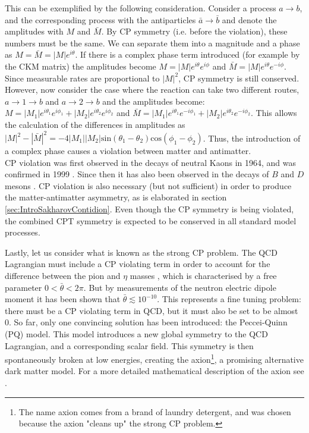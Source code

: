 This can be exemplified by the following consideration. Consider a process $a \rightarrow b$, and the corresponding process with the antiparticles $\bar{a} \rightarrow \bar{b}$ and denote the amplitudes with $M$ and $\bar{M}$. By CP symmetry (i.e. before the violation), these numbers must be the same. We can separate them into a magnitude and a phase as $M = \bar{M} = |M|e^{i\theta}$. If there is a complex phase term introduced (for example by the CKM matrix) the amplitudes become $M = |M|e^{i\theta}e^{i\phi}$ and $\bar{M} = |M|e^{i\theta}e^{-i\phi}$. Since measurable rates are proportional to $|M|^2$, CP symmetry is still conserved. However, now consider the case where the reaction can take two different routes, $a \rightarrow 1 \rightarrow b$ and $a \rightarrow 2 \rightarrow b$ and the amplitudes become: $M = |M_1|e^{i\theta_1}e^{i\phi_1} + |M_2|e^{i\theta_2}e^{i\phi_2}$ and $\bar{M} = |M_1|e^{i\theta_1}e^{-i\phi_1} + |M_2|e^{i\theta_2}e^{-i\phi_2}$. This allows the calculation of the differences in amplitudes as $|M|^2 - |\bar{M}|^2 = -4|M_1||M_2|\mathrm{sin}(\theta_1 - \theta_2)\mathrm{cos}(\phi_1 - \phi_2)$. Thus, the introduction of a complex phase causes a violation between matter and antimatter. \\
CP violation was first observed in the decays of neutral Kaons\cite{CP_violations_early} in 1964, and was confirmed in 1999 \cite{CP_violations_proof}. Since then it has also been observed in the decays of $B$ and $D$ mesons \cite{CP_violation_B, CP_violation_D}. CP violation is also necessary (but not sufficient) in order to produce the matter-antimatter asymmetry, as is elaborated in section \ref{sec:IntroSakharovContidion}. Even though the CP symmetry is being violated, the combined CPT symmetry is expected to be conserved in all standard model processes\cite{}. 

Lastly, let us consider what is known as the strong CP problem. The QCD Lagrangian must include a CP violating term in order to account for the difference between the pion and $\eta$ masses \cite{tHooft}, which is characterised by a free parameter $0<\bar{\theta}<2\pi$. But by measurements of the neutron electric dipole moment it has been shown that $\bar{\theta} \lesssim 10^{-10}$. This represents a fine tuning problem: there must be a CP violating term in QCD, but it must also be set to be almost 0. So far, only one convincing solution has been introduced: the Peccei-Quinn (PQ) model. This model introduces a new global symmetry to the QCD Lagrangian, and a corresponding scalar field. This symmetry is then spontaneously broken at low energies, creating the axion\footnote{The name axion comes from a brand of laundry detergent, and was chosen because the axion "cleans up" the strong CP problem.}, a promising alternative dark matter model. For a more detailed mathematical description of the axion see \cite{axion_review}.


